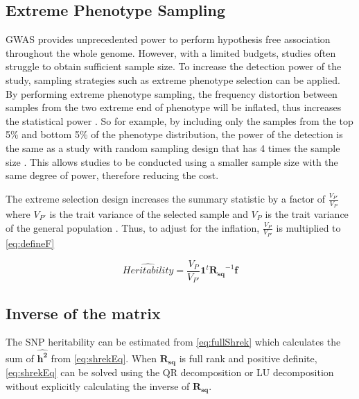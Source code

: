 		\subsection{Extreme Phenotype Sampling}
			\gls{GWAS} provides unprecedented power to perform hypothesis free association throughout the whole genome.
			However, with a limited budgets, studies often struggle to obtain sufficient sample size.
			To increase the detection power of the study, sampling strategies such as extreme phenotype selection can be applied.
			By performing extreme phenotype sampling, the frequency distortion between samples from the two extreme end of phenotype will be inflated, thus increases the statistical power \citep{Guey2011}.
			So for example, by including only the samples from the top 5\% and bottom 5\% of the phenotype distribution, the power of the detection is the same as a study with random sampling design that has 4 times the sample size \citep{Sham2014}. 
			This allows studies to be conducted using a smaller sample size with the same degree of power, therefore reducing the cost.
			
			The extreme selection design increases the summary statistic by a factor of $\frac{V_{P'}}{V_P}$ where $V_{P'}$ is the trait variance of the selected sample and $V_P$ is the trait variance of the general population \citep{Sham2014}.
			Thus, to adjust for the inflation, $\frac{V_P}{V_{P'}}$ is multiplied to \cref{eq:defineF}
			
			\begin{equation}
			\hat{Heritability} = \frac{V_P}{V_{P'}}\boldsymbol{1}^t\boldsymbol{R_{sq}}^{-1}\boldsymbol{f}
			\label{eq:extremeShrek}
			\end{equation}
			
		\subsection{Inverse of the  matrix}
			The \gls{SNP} heritability can be estimated from \cref{eq:fullShrek} which calculates the sum of $\boldsymbol{\hat{h^2}}$ from \cref{eq:shrekEq}.
			When $\boldsymbol{R_{sq}}$ is full rank and positive definite, \cref{eq:shrekEq} can be solved using the QR decomposition or LU decomposition without explicitly calculating the inverse of $\boldsymbol{R_{sq}}$.
			
